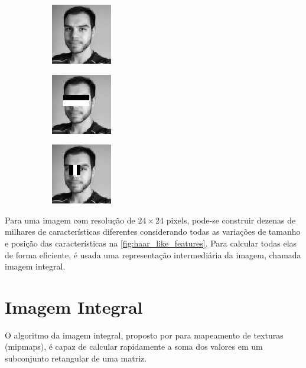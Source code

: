 \begin{figure}[htbp]
    \caption{Características usadas para detectar olhos e nariz}
    \label{fig:julio_haar}
    \begin{subfigure}[c]{0.3\textwidth}
    \centering
    \includegraphics{imagens/julio_haar1.png}
    \caption{}
    \end{subfigure}
    \begin{subfigure}[c]{0.3\textwidth}
    \centering
    \includegraphics{imagens/julio_haar2.png}
    \caption{}
    \end{subfigure}
    \begin{subfigure}[c]{0.3\textwidth}
    \centering
    \includegraphics{imagens/julio_haar3.png}
    \caption{}
    \end{subfigure}
\end{figure}

Para uma imagem com resolução de $24\times24$ pixels, pode-se construir dezenas de milhares de características diferentes considerando todas as variações de tamanho e posição das características na \autoref{fig:haar_like_features}. Para calcular todas elas de forma eficiente, é usada uma representação intermediária da imagem, chamada imagem integral.


\section{Imagem Integral}\label{sec:imagem_integral}

O algoritmo da imagem integral, proposto por  para mapeamento de texturas (mipmaps), é capaz de calcular rapidamente a soma dos valores em um subconjunto retangular de uma matriz.

